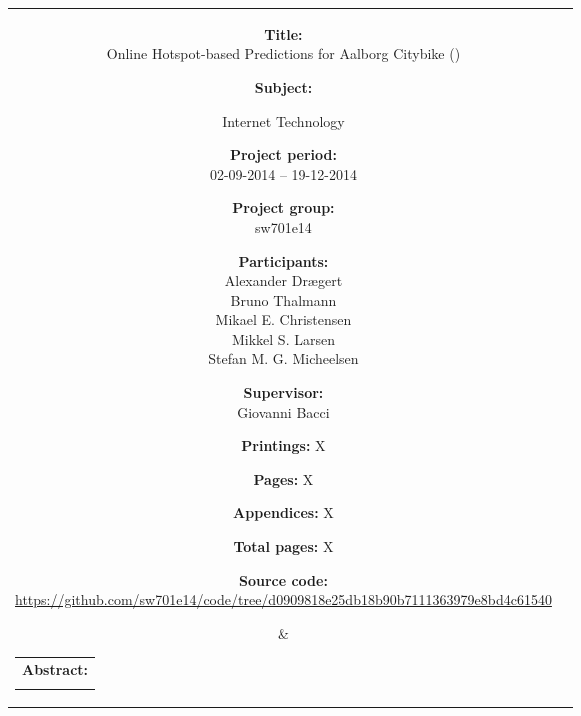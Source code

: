 \begin{titlepage}
\begin{nopagebreak}
{\begin{tabular}{cc}
	\parbox{6cm}{
	\begin{description}
		\item { \textbf{Title:}}\\
			Online Hotspot-based Predictions for Aalborg Citybike (\projectname)
    		\item { \textbf{Subject:}}\\
			\raggedright Internet Technology
		\item { \textbf{Project period:}}\\
			02-09-2014 -- 19-12-2014
 		\hspace{4cm}
		\item { \textbf{Project group:}}\\
  			sw701e14
 		\hspace{4cm}
		\item {\textbf{Participants:}}\\
			Alexander Drægert\\
			Bruno Thalmann\\
			Mikael E. Christensen\\
			Mikkel S. Larsen\\
			Stefan M. G. Micheelsen
		\item { \textbf{Supervisor:}}\\
 			Giovanni Bacci
		\item { \textbf{Printings:} X }
		\item { \textbf{Pages:} X } 
		\item { \textbf{Appendices:} X }
		\item { \textbf{Total pages:} X }
		\item { \textbf{Source code:}\\ {\small \mbox{\footnotesize\url{https://github.com/sw701e14/code/tree/d0909818e25db18b90b7111363979e8bd4c61540}}}}
	\end{description}
	\vfill } &
	\parbox{8cm}{
  	\hfill 
  	\begin{tabular}{l}
  		{ \textbf{Abstract:}} \\
  		\fbox{
  		\parbox{8cm}{\smallskip
     		{\vfill{\footnotesize 
     		\smallskip}}}
     	}
   	\end{tabular}}
\end{tabular}
}%
\end{nopagebreak}
\end{titlepage}